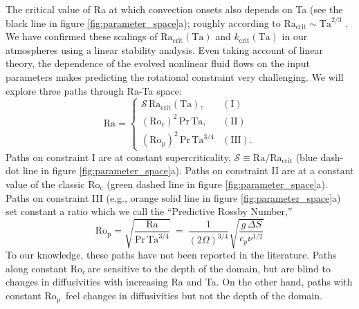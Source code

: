 \documentclass[twocolumn, amsmath, amsfonts, amssymb]{aastex62}
\newcommand{\pro}{\ensuremath{\text{Ro}_{\text{p}}}}
\newcommand{\con}{\ensuremath{\text{Ro}_{\text{c}}}}
\begin{document}
The critical value of Ra at which convection onsets also depends on Ta (see the black line in figure \ref{fig:parameter_space}a);  
roughly according to $\text{Ra}_{\text{crit}} \sim \text{Ta}^{2/3}$ \citep{Chandrasekhar,calkins&all2015a}.
We have confirmed these scalings of $\text{Ra}_{\text{crit}}(\text{Ta})$ and 
$k_{\text{crit}}(\text{Ta})$ in our atmospheres using a linear
stability analysis.
Even taking account of linear theory, the dependence of the evolved nonlinear fluid 
flows on the input parameters makes predicting the rotational constraint very challenging. 
We will explore three paths through Ra-Ta space:
\begin{equation}
    \text{Ra} = 
    \begin{cases}
    \mathcal{S}\,\text{Ra}_\text{crit}(\text{Ta}), & (\text{I})\\
    (\con)^2 \, \text{Pr}\, \text{Ta}, & (\text{II}) \\
    (\pro)^2\, \text{Pr}\, \text{Ta}^{3/4} & (\text{III}).
    \end{cases}
    \label{eqn:paths}
\end{equation}
Paths on constraint I are at constant supercriticality, 
$\mathcal{S} \equiv \text{Ra}/\text{Ra}_{\text{crit}}$
(blue dash-dot line in figure \ref{fig:parameter_space}a).
Paths on constraint II are at a constant value of the classic $\con$ (green dashed line in figure \ref{fig:parameter_space}a). Paths on constraint
III (e.g., orange solid line in figure \ref{fig:parameter_space}a) 
set constant a ratio which we call the ``Predictive Rossby Number,'' 
\begin{equation}
\pro = \sqrt{\frac{\text{Ra}}{\text{Pr}\,\text{Ta}^{3/4}}} \ = \    
\frac{1}{(2 \Omega)^{3/4}} \sqrt{\frac{g \, \Delta  S}{c_{p} \nu^{1/2}}}
\end{equation}
To our knowledge, these paths have not been reported in the literature. 
Paths along constant \con$\,$are sensitive to the depth of the domain, 
but are blind to changes in diffusivities with increasing Ra and Ta. 
On the other hand, paths with constant \pro$\,$ 
feel changes in diffusivities but not the depth of the domain.

\end{document}
